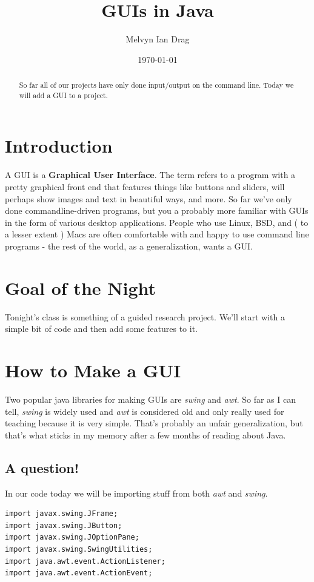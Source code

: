 \documentclass[12pt]{article}
\title{GUIs in Java}
\author{
	Melvyn Ian Drag
}
\date{\today}
\begin{document}
\maketitle

\begin{abstract}
So far all of our projects have only done input/output on the command line.
Today we will add a GUI to a project.
\end{abstract}

\section{Introduction}
A GUI is a \textbf{Graphical User Interface}. The term refers to a program with
a pretty graphical front end that features things like buttons and sliders, will
perhaps show images and text in beautiful ways, and more. So far we've only done
commandline-driven programs, but you a probably more familiar with GUIs in the
form of various desktop applications. People who use Linux, BSD, and ( to a
lesser extent ) Macs are often comfortable with and happy to use command line
programs - the rest of the world, as a generalization, wants a GUI.

\section{Goal of the Night}
Tonight's class is something of a guided research project. We'll start with a
simple bit of code and then add some features to it.
\section{How to Make a GUI}
Two popular java libraries for making GUIs are \textit{swing} and \textit{awt}.
So far as I can tell, \textit{swing} is widely used and \textit{awt} is
considered old and only really used for teaching because it is very simple.
That's probably an unfair generalization, but that's what sticks in my memory
after a few months of reading about Java.

\subsection{A question!}
In our code today we will be importing stuff from both \textit{awt} and
\textit{swing}.

\begin{lstlisting}
import javax.swing.JFrame;
import javax.swing.JButton;
import javax.swing.JOptionPane;
import javax.swing.SwingUtilities;
import java.awt.event.ActionListener;
import java.awt.event.ActionEvent;
\end{lstlisting}
\end{document}
